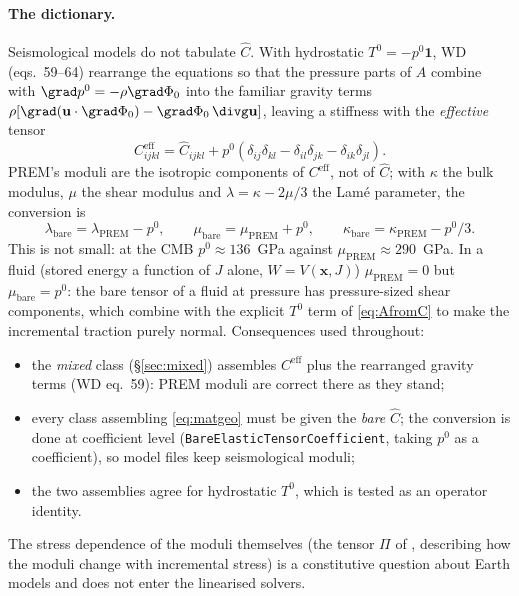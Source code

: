 \documentclass[11pt]{article}
\numberwithin{equation}{section}
\theoremstyle{remark}
\newcommand{\vu}{\mathbf{u}}
\newcommand{\vx}{\mathbf{x}}
\newcommand{\Ch}{\hat{C}}
\newcommand{\code}[1]{\texttt{#1}}
\begin{document}
\paragraph{The dictionary.} Seismological models do not tabulate $\Ch$.
With hydrostatic $T^0 = -p^0\mathbf{1}$, WD (eqs.~59--64) rearrange the equations so that
the pressure parts of $A$ combine with $\grad p^0 = -\rho\grad\Phi_0$ into
the familiar gravity terms $\rho[\grad(\vu\cdot\grad\Phi_0) -
\grad\Phi_0\,\divg\vu]$, leaving a stiffness with the \emph{effective}
tensor
\begin{equation}
  C^{\mathrm{eff}}_{ijkl} = \Ch_{ijkl}
    + p^0(\delta_{ij}\delta_{kl} - \delta_{il}\delta_{jk} - \delta_{ik}\delta_{jl}).
  \label{eq:Ceff}
\end{equation}
PREM's moduli are the isotropic components of $C^{\mathrm{eff}}$, not of
$\Ch$; with $\kappa$ the bulk modulus, $\mu$ the shear modulus and
$\lambda = \kappa - 2\mu/3$ the Lam\'e parameter, the conversion is
\begin{equation}
  \lambda_{\mathrm{bare}} = \lambda_{\mathrm{PREM}} - p^0, \qquad
  \mu_{\mathrm{bare}} = \mu_{\mathrm{PREM}} + p^0, \qquad
  \kappa_{\mathrm{bare}} = \kappa_{\mathrm{PREM}} - p^0/3 .
  \label{eq:bare}
\end{equation}
This is not small: at the CMB $p^0 \approx 136$~GPa against
$\mu_{\mathrm{PREM}} \approx 290$~GPa. In a fluid (stored energy a
function of $J$ alone, $W = V(\vx,J)$)
$\mu_{\mathrm{PREM}} = 0$ but $\mu_{\mathrm{bare}} = p^0$: the bare tensor
of a fluid at pressure has pressure-sized shear components, which combine
with the explicit $T^0$ term of \eqref{eq:AfromC} to make the incremental
traction purely normal. Consequences used throughout:
\begin{itemize}
\item the \emph{mixed} class (\S\ref{sec:mixed}) assembles $C^{\mathrm{eff}}$
  plus the rearranged gravity terms (WD eq.~59): PREM moduli are correct
  there as they stand;
\item every class assembling \eqref{eq:matgeo} must be given the
  \emph{bare} $\Ch$; the conversion is done at coefficient level
  (\code{BareElasticTensorCoefficient}, taking $p^0$ as a coefficient), so
  model files keep seismological moduli;
\item the two assemblies agree for hydrostatic $T^0$, which is tested as
  an operator identity.
\end{itemize}
The stress dependence of the moduli themselves (the tensor $\Pi$ of
\cite{MaitraAlAttar2021}, describing how the moduli change with
incremental stress) is a constitutive question about Earth models and
does not enter the linearised solvers.
\end{document}
